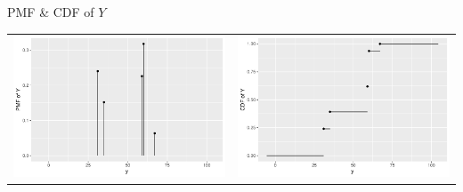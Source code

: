 \begin{frame}

  \begin{center}
    PMF \& CDF of $Y$
    
      \begin{tabular}{cc}
      \includegraphics[width = .5\textwidth]{figure/clt3c-1} &
      \includegraphics[width = .5\textwidth]{figure/clt3c-2}
      \end{tabular}
  
  \end{center}
\end{frame}

